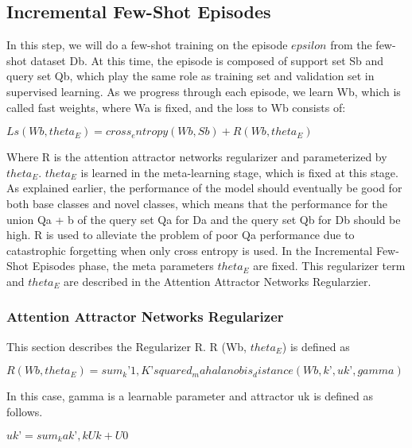 \documentclass[10pt,twocolumn,letterpaper]{article}
\begin{document}
\subsection{Incremental Few-Shot Episodes}\label{fewshot}

In this step, we will do a few-shot training on the episode $ epsilon $ from the few-shot dataset Db. At this time, the episode is composed of support set Sb and query set Qb, which play the same role as training set and validation set in supervised learning. As we progress through each episode, we learn Wb, which is called fast weights, where Wa is fixed, and the loss to Wb consists of:

$ Ls (Wb, theta_E) = cross_entropy (Wb, Sb) + R (Wb, theta_E) $

Where R is the attention attractor networks regularizer and parameterized by $ theta_E $. $ theta_E $ is learned in the meta-learning stage, which is fixed at this stage. As explained earlier, the performance of the model should eventually be good for both base classes and novel classes, which means that the performance for the union Qa + b of the query set Qa for Da and the query set Qb for Db should be high. R is used to alleviate the problem of poor Qa performance due to catastrophic forgetting when only cross entropy is used. In the Incremental Few-Shot Episodes phase, the meta parameters $theta_E$ are fixed. This regularizer term and $ theta_E $ are described in the Attention Attractor Networks Regularzier.

\subsubsection{Attention Attractor Networks Regularizer}\label{atnr}
This section describes the Regularizer R. R (Wb, $ theta_E $) is defined as

$R (Wb, theta_E) = sum_k ’{1, K’} squared_mahalanobis_distance (Wb, k ’, uk’, gamma)$

In this case, gamma is a learnable parameter and attractor uk is defined as follows.

$uk ’= sum_k ak’, k Uk + U0$

\end{document}
